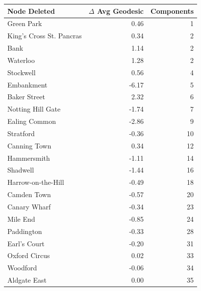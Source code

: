 \documentclass[11pt]{article} %
\begin{document}


 
 

\begin{table}[htbp]
\centering
\begin{tabular}{|l|r|r|}
\hline
Node Deleted & \multicolumn{1}{l|}{$\Delta$ Avg Geodesic} & \multicolumn{1}{l|}{Components} \\ \hline
Green Park & 0.46 & 1 \\ 
King's Cross St. Pancras & 0.34 & 2 \\ 
Bank & 1.14 & 2 \\ 
Waterloo & 1.28 & 2 \\ 
Stockwell & 0.56 & 4 \\ 
Embankment & -6.17 & 5 \\ 
Baker Street & 2.32 & 6 \\ 
Notting Hill Gate & -1.74 & 7 \\ 
Ealing Common & -2.86 & 9 \\ 
Stratford & -0.36 & 10 \\ 
Canning Town & 0.34 & 12 \\ 
Hammersmith & -1.11 & 14 \\ 
Shadwell & -1.44 & 16 \\ 
Harrow-on-the-Hill & -0.49 & 18 \\ 
Camden Town & -0.57 & 20 \\ 
Canary Wharf & -0.34 & 23 \\ 
Mile End & -0.85 & 24 \\ 
Paddington & -0.33 & 28 \\ 
Earl's Court & -0.20 & 31 \\ 
Oxford Circus & 0.02 & 33 \\ 
Woodford & -0.06 & 34 \\ 
Aldgate East & 0.00 & 35 \\ 

\end{tabular}
\end{table}
\end{document}
